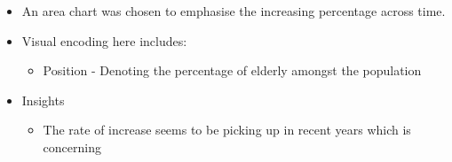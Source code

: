 \documentclass[a4paper, 11pt]{article}
\begin{document}
\begin{itemize}
\item An area chart was chosen to emphasise the increasing percentage across time.
\item Visual encoding here includes:
\begin{itemize}
\item Position - Denoting the percentage of elderly amongst the population
\end{itemize}
\item Insights
\begin{itemize}
\item The rate of increase seems to be picking up in recent years which is concerning
\end{itemize}
\end{itemize}
\end{document}
